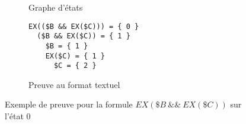 \begin{figure}[H]
\centering
\begin{subfigure}[b]{.4\textwidth}
\centering
\caption{Graphe d'états}
\end{subfigure}
\begin{subfigure}[b]{.4\textwidth}
\centering
\begin{minipage}{0.68\linewidth}
\begin{verbatim}
EX(($B && EX($C))) = { 0 }
  ($B && EX($C)) = { 1 }
    $B = { 1 }
    EX($C) = { 1 }
      $C = { 2 }
\end{verbatim}
\end{minipage}
\caption{Preuve au format textuel}
\end{subfigure}
\caption{Exemple de preuve pour la formule $EX(\$B~\&\&~EX(\$C))$ sur l'état 0}
\label{fig:PreuveAffichageTextuel}
\end{figure}